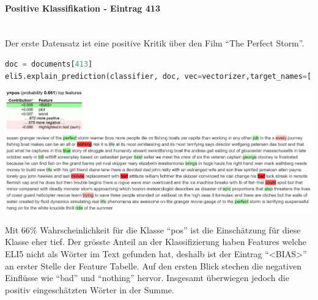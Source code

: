 \documentclass[
  12pt, %
  a4paper, %
  oneside, %
  openany, 
  numbers=noenddot, %
  BCOR=5mm, %
  parskip=half*, %
  thesis, %
]{bfhbook}
\newcommand{\parag}[1]{\paragraph*{#1}\mbox{}\\}
\begin{document}
\parag{Positive Klassifikation - Eintrag 413}
Der erste Datensatz ist eine positive Kritik über den Film ``The Perfect Storm''.
\begin{lstlisting}[language=Python]
doc = documents[413]
eli5.explain_prediction(classifier, doc, vec=vectorizer,target_names=['neg','pos'], top=20)
\end{lstlisting}
\label{eli5413}

\begin{center}
\begin{minipage}[t]{\linewidth}
\includegraphics[width=\textwidth]{Bilder/MovieReviews-SentimentClassification_ELI5-413.PNG}
\end{minipage}
\end{center}

Mit 66\% Wahrscheinlichkeit für die Klasse ``pos'' ist die Einschätzung für diese Klasse eher tief. Der grösste Anteil an der Klassifizierung haben Features welche ELI5 nicht als Wörter im Text gefunden hat, deshalb ist der Eintrag ``<BIAS>'' an erster Stelle der Feature Tabelle. Auf den ersten Blick stechen die negativen Einflüsse wie ``bad'' und ``nothing'' hervor. Insgesamt überwiegen jedoch die positiv eingeschätzten Wörter in der Summe.
\end{document}

